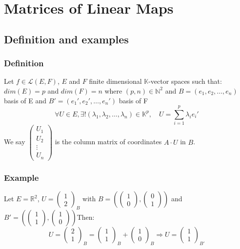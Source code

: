 \documentclass[notitlepage]{math}
\begin{document}
\section{Matrices of Linear Maps}
\subsection{Definition and examples}
\subsubsection{Definition}
Let $f \in \mathcal{L}(E,F)$, $E$ and $F$ finite dimensional $\mathbb{K}$-vector spaces such that:
$dim (E) = p$ and $dim (F) = n$ where $(p,n) \in \mathbb{N}^2$ and $B = (e_1,e_2,\dots,e_n)$ basis of E and $B' = (e_1',e_2',\dots,e_n')$ basis of F
\[ \forall U \in E, \exists ! (\lambda_1, \lambda_2, \dots, \lambda_n) \in \mathbb{K}^p, \quad U=\sum_{i=1}^{p} \lambda_i e_i' \]
We say $\begin{pmatrix} U_1 \\ U_2 \\ \vdots \\ U_n \end{pmatrix}$ is the column matrix of coordinates $A \cdot U$ in $B$.
\subsubsection{Example}
Let $E = \mathbb{R}^2$, $U = {\begin{pmatrix} 1 \\ 2 \end{pmatrix}}_B$ with $B = (\begin{pmatrix} 1 \\ 0 \end{pmatrix}, \begin{pmatrix} 0 \\ 1 \end{pmatrix})$ and $B' = (\begin{pmatrix} 1 \\ 1 \end{pmatrix}, \begin{pmatrix} 1 \\ 0 \end{pmatrix})$Then:
\[U = {\begin{pmatrix} 2 \\ 1 \end{pmatrix}}_B = {\begin{pmatrix} 1 \\ 1 \end{pmatrix}}_B + {\begin{pmatrix} 1 \\ 0 \end{pmatrix}}_B \Rightarrow U = {\begin{pmatrix} 1 \\ 1 \end{pmatrix}}_{B'}\]
\end{document}

